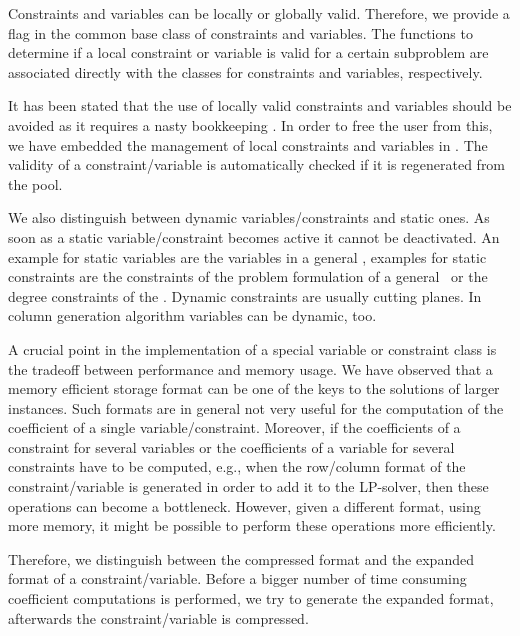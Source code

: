 Constraints and variables can be locally or globally 
valid.
Therefore, we 
provide a flag in the common base class of constraints and variables.
The functions to determine if a local constraint or variable is valid for a certain
subproblem are associated directly with the classes for constraints
and variables, respectively.

It has been stated that the use of locally valid constraints and
variables should be avoided as it requires a nasty bookkeeping \cite{PR91}. 
In order to free the user from this, we have embedded the management
of local constraints and 
variables in \ABACUS. The validity of a constraint/variable is
automatically checked if it is regenerated from the pool.

We also distinguish between dynamic 
variables/constraints 
and static
ones. As soon as a static variable/constraint becomes active it cannot
be deactivated. An example for static variables are the variables 
in a general \mip, examples for static constraints are the constraints
of the problem formulation of a general \mip\ or the degree constraints
of the \tsp. Dynamic constraints are usually cutting planes. In
column generation algorithm variables can be dynamic, too.

A crucial point in the implementation of a special variable or constraint
class is the tradeoff between performance and memory usage. We have
observed that a memory efficient storage format can be one of the keys
to the solutions of larger instances. Such formats are in general 
not very useful for the computation of the coefficient of a single
variable/constraint. Moreover, if the coefficients of a constraint 
for several variables or the coefficients of a variable for several
constraints have to be computed, e.g., when the row/column format
of the constraint/variable is generated in order to
add it to the LP-solver, then these operations can become a bottleneck.
However, given a different format, using more memory, it might be
possible to perform these operations more efficiently. 

Therefore, we distinguish between the compressed format
and the expanded format
of a constraint/var\-i\-a\-ble.
Before a bigger number of time
consuming coefficient computations is performed, we try to generate the expanded
format, afterwards the constraint/variable is compressed.

